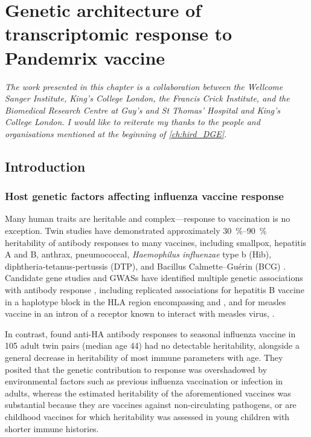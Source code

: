 %
%

\chapter{Genetic architecture of transcriptomic response to Pandemrix vaccine}
\label{ch:hird_reQTL}

\textit{
    The work presented in this chapter is a collaboration between 
    the Wellcome Sanger Institute,
    King's College London, 
    the Francis Crick Institute,
    and the Biomedical Research Centre at Guy's and St Thomas' Hospital and King's College London.
    I would like to reiterate my thanks to the people and organisations mentioned at the beginning of \cref{ch:hird_DGE}.
}

\section{Introduction}

\subsection{Host genetic factors affecting influenza vaccine response}
\label{subsec:hird_reQTL_intro_geneticFactorsFluVaccine}

Many human traits are heritable and complex---response to vaccination is no exception.
Twin studies have demonstrated approximately \SIrange{30}{90}{\percent} heritability of antibody responses to many vaccines, including smallpox, hepatitis A and B, anthrax, pneumococcal, \textit{Haemophilus influenzae} type b (Hib), diphtheria-tetanus-pertussis (DTP), and Bacillus Calmette--Guérin (BCG) \autocite{mooney2013SystemsImmunogeneticsVaccines,oconnor2013CharacterizingVaccineResponses,newport2015GeneticRegulationInfant,brodin2015VariationHumanImmune}.
Candidate gene studies and \glspl{GWAS} have identified multiple genetic associations with antibody response \autocite{mooney2013SystemsImmunogeneticsVaccines,oconnor2013CharacterizingVaccineResponses,mentzer2015SearchingHumanGenetic,linnik2016ImpactHostGenetic}, 
including replicated associations 
for hepatitis B vaccine in a haplotype block in the \gls{HLA} region encompassing  and ,
and for measles vaccine in an intron of a receptor known to interact with measles virus, .

In contrast, \textcite{brodin2015VariationHumanImmune} found anti-\gls{HA} antibody responses to seasonal influenza vaccine in 105 adult twin pairs (median age \SI{44}{\year}) had no detectable heritability,
alongside a general decrease in heritability of most immune parameters with age.
They posited 
that the genetic contribution to response was overshadowed by environmental factors such as previous influenza vaccination or infection in adults, 
whereas the estimated heritability of the aforementioned vaccines was substantial
because they are vaccines against non-circulating pathogens, 
or are childhood vaccines for which heritability was assessed in young children with shorter immune histories.


